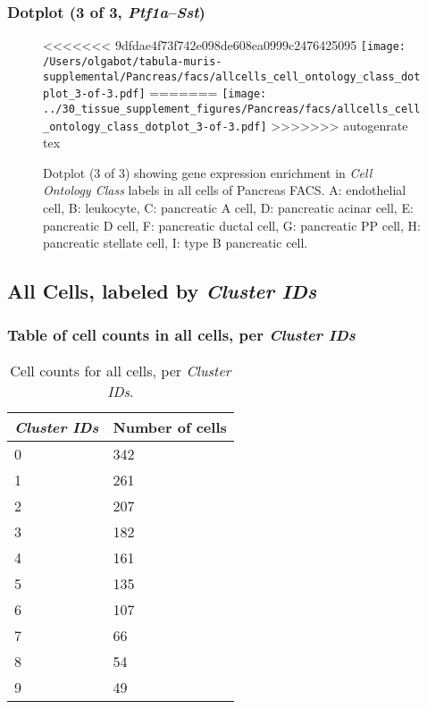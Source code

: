 \clearpage

\subsubsection{Dotplot (3 of 3, \emph{Ptf1a}--\emph{Sst})}
\begin{figure}[h]
\centering
<<<<<<< 9dfdae4f73f742e098de608ea0999c2476425095
\texttt{[image: /Users/olgabot/tabula-muris-supplemental/Pancreas/facs/allcells\_cell\_ontology\_class\_dotplot\_3-of-3.pdf]}
=======
\texttt{[image: ../30\_tissue\_supplement\_figures/Pancreas/facs/allcells\_cell\_ontology\_class\_dotplot\_3-of-3.pdf]}
>>>>>>> autogenrate tex

\caption{ Dotplot (3 of 3)  showing gene expression enrichment in \emph{Cell Ontology Class} labels in all cells of Pancreas FACS. A: endothelial cell, B: leukocyte, C: pancreatic A cell, D: pancreatic acinar cell, E: pancreatic D cell, F: pancreatic ductal cell, G: pancreatic PP cell, H: pancreatic stellate cell, I: type B pancreatic cell.}
\end{figure}


\clearpage

\subsection{All Cells, labeled by \emph{Cluster IDs}}
\subsubsection{Table of cell counts in all cells, per \emph{Cluster IDs}}\begin{table}[h]
\centering
\label{my-label}
\begin{tabular}{@{}ll@{}}
\toprule

\emph{Cluster IDs}& Number of cells \\ \midrule
0 & 342 \\

1 & 261 \\

2 & 207 \\

3 & 182 \\

4 & 161 \\

5 & 135 \\

6 & 107 \\

7 & 66 \\

8 & 54 \\

9 & 49 \\
\bottomrule
\end{tabular}
\caption{Cell counts for all cells, per \emph{Cluster IDs}.}
\end{table}

